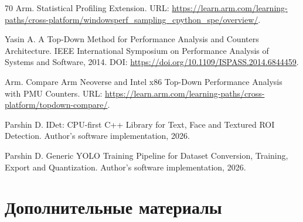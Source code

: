 \documentclass[12pt,a4paper,oneside,openany]{report}
\begin{document}
\begin{thebibliography}{70}
Arm.
Statistical Profiling Extension.
URL: \url{https://learn.arm.com/learning-paths/cross-platform/windowsperf_sampling_cpython_spe/overview/}.

Yasin A.
A Top-Down Method for Performance Analysis and Counters Architecture.
IEEE International Symposium on Performance Analysis of Systems and Software, 2014.
DOI: \url{https://doi.org/10.1109/ISPASS.2014.6844459}.

Arm.
Compare Arm Neoverse and Intel x86 Top-Down Performance Analysis with PMU Counters.
URL: \url{https://learn.arm.com/learning-paths/cross-platform/topdown-compare/}.


Parshin D.
IDet: CPU-first C++ Library for Text, Face and Textured ROI Detection.
Author's software implementation, 2026.

Parshin D.
Generic YOLO Training Pipeline for Dataset Conversion, Training, Export and Quantization.
Author's software implementation, 2026.

\end{thebibliography}


\clearpage
\appendix
\chapter*{Дополнительные материалы}

\renewcommand{\thesection}{A.\arabic{section}}
\setcounter{section}{0}
\setcounter{table}{0}
\setcounter{figure}{0}
\setcounter{lstlisting}{0}
\renewcommand{\thetable}{A.\arabic{table}}
\renewcommand{\thefigure}{A.\arabic{figure}}
\renewcommand{\thelstlisting}{A.\arabic{lstlisting}}
\renewcommand{\theHsection}{appA.\arabic{section}}
\renewcommand{\theHtable}{appA.\arabic{table}}
\renewcommand{\theHfigure}{appA.\arabic{figure}}
\renewcommand{\theHlstlisting}{appA.\arabic{lstlisting}}

\end{document}
